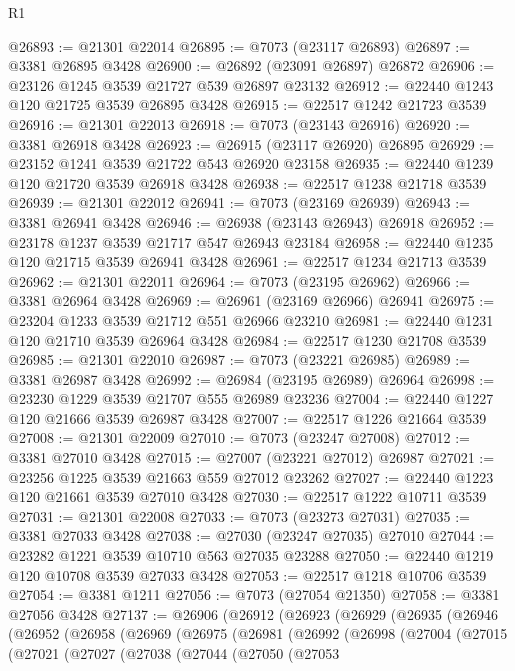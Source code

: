 \begin{lexlean}{R1}
\begin{coremodule}
@26893 := @21301 @22014
@26895 := @7073 (@23117 @26893)
@26897 := @3381 @26895 @3428
@26900 := @26892 (@23091 @26897) @26872
@26906 := @23126 @1245 @3539 @21727 @539 @26897 @23132
@26912 := @22440 @1243 @120 @21725 @3539 @26895 @3428
@26915 := @22517 @1242 @21723 @3539
@26916 := @21301 @22013
@26918 := @7073 (@23143 @26916)
@26920 := @3381 @26918 @3428
@26923 := @26915 (@23117 @26920) @26895
@26929 := @23152 @1241 @3539 @21722 @543 @26920 @23158
@26935 := @22440 @1239 @120 @21720 @3539 @26918 @3428
@26938 := @22517 @1238 @21718 @3539
@26939 := @21301 @22012
@26941 := @7073 (@23169 @26939)
@26943 := @3381 @26941 @3428
@26946 := @26938 (@23143 @26943) @26918
@26952 := @23178 @1237 @3539 @21717 @547 @26943 @23184
@26958 := @22440 @1235 @120 @21715 @3539 @26941 @3428
@26961 := @22517 @1234 @21713 @3539
@26962 := @21301 @22011
@26964 := @7073 (@23195 @26962)
@26966 := @3381 @26964 @3428
@26969 := @26961 (@23169 @26966) @26941
@26975 := @23204 @1233 @3539 @21712 @551 @26966 @23210
@26981 := @22440 @1231 @120 @21710 @3539 @26964 @3428
@26984 := @22517 @1230 @21708 @3539
@26985 := @21301 @22010
@26987 := @7073 (@23221 @26985)
@26989 := @3381 @26987 @3428
@26992 := @26984 (@23195 @26989) @26964
@26998 := @23230 @1229 @3539 @21707 @555 @26989 @23236
@27004 := @22440 @1227 @120 @21666 @3539 @26987 @3428
@27007 := @22517 @1226 @21664 @3539
@27008 := @21301 @22009
@27010 := @7073 (@23247 @27008)
@27012 := @3381 @27010 @3428
@27015 := @27007 (@23221 @27012) @26987
@27021 := @23256 @1225 @3539 @21663 @559 @27012 @23262
@27027 := @22440 @1223 @120 @21661 @3539 @27010 @3428
@27030 := @22517 @1222 @10711 @3539
@27031 := @21301 @22008
@27033 := @7073 (@23273 @27031)
@27035 := @3381 @27033 @3428
@27038 := @27030 (@23247 @27035) @27010
@27044 := @23282 @1221 @3539 @10710 @563 @27035 @23288
@27050 := @22440 @1219 @120 @10708 @3539 @27033 @3428
@27053 := @22517 @1218 @10706 @3539
@27054 := @3381 @1211
@27056 := @7073 (@27054 @21350)
@27058 := @3381 @27056 @3428
@27137 := @26906
    (@26912
      (@26923
        (@26929
          (@26935
            (@26946
              (@26952
                (@26958
                  (@26969
                    (@26975
                      (@26981
                        (@26992
                          (@26998
                            (@27004
                              (@27015
                                (@27021
                                  (@27027
                                    (@27038
                                      (@27044
                                        (@27050
                                          (@27053

\end{coremodule}
\end{lexlean}
